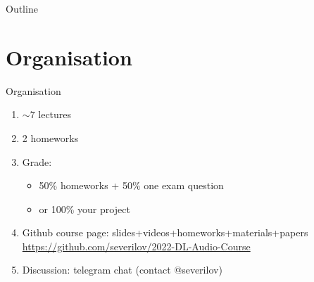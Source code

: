 
\usepackage{tikz}
\usetikzlibrary{arrows,shapes,positioning,shadows,trees}

\begin{frame}
\titlepage
\end{frame}
\begin{frame}{Outline}
	\tableofcontents
\end{frame}
\section{Organisation}
\begin{frame}{Organisation}
	\begin{enumerate}
		\item $\sim 7$ lectures
		\item 2 homeworks
		\item Grade: 
		\begin{itemize}
			\item 50\% homeworks + 50\%  one exam question
			\item or 100\% your project
		\end{itemize}
		\item Github course page: slides+videos+homeworks+materials+papers \url{https://github.com/severilov/2022-DL-Audio-Course}
		\item Discussion: telegram chat (contact @severilov)
	\end{enumerate}
\end{frame}
